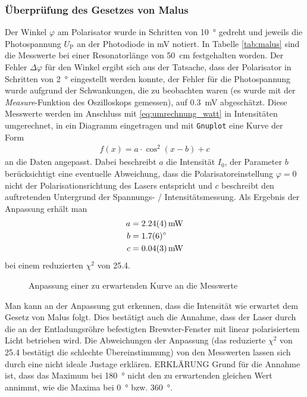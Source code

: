 \documentclass[11pt, a4paper]{article}
\numberwithin{equation}{section}
\begin{document}
\subsubsection{Überprüfung des Gesetzes von Malus}
Der Winkel $\varphi$ am Polarisator wurde in Schritten von \SI{10}{\degree} gedreht und jeweils die Photospannung $U_\text{P}$ an der Photodiode in \si{\milli\volt} notiert.
In Tabelle \ref{tab:malus} sind die Messwerte bei einer Resonatorlänge von \SI{50}{\centi\metre} festgehalten worden.
Der Fehler $\Delta\varphi$ für den Winkel ergibt sich aus der Tatsache, dass der Polarisator in Schritten von \SI{2}{\degree} eingestellt werden konnte, der Fehler für die Photospannung wurde aufgrund der Schwankungen, die zu beobachten waren (es wurde mit der \emph{Measure}-Funktion des Oszilloskops gemessen), auf \SI{0.3}{\milli\volt} abgeschätzt.
Diese Messwerte werden im Anschluss mit \eqref{eq:umrechnung_watt} in Intensitäten umgerechnet, in ein Diagramm eingetragen und mit \texttt{Gnuplot} eine Kurve der Form
\begin{align}
f(x) = a\cdot\cos^2(x-b) + c
\end{align}
an die Daten angepasst.
Dabei beschreibt $a$ die Intensität $I_0$, der Parameter $b$ berücksichtigt eine eventuelle Abweichung, dass die Polarisatoreinstellung $\varphi=0$ nicht der Polarisationsrichtung des Lasers entspricht und $c$ beschreibt den auftretenden Untergrund der Spannungs- / Intensitätsmessung.
Als Ergebnis der Anpassung erhält man
\begin{align}
a&=\SI{2.24+-0.04}{\milli\watt}\\
b&=\SI{1.7+-0.6}{\degree}\\
c&=\SI{0.04+-0.03}{\milli\watt}
\end{align}
bei einem reduzierten $\chi^2$ von \num{25.4}.
\begin{figure}
	\centering
	
	\caption{Anpassung einer zu erwartenden Kurve an die Messwerte}
	\label{fig:malus}
\end{figure}
Man kann an der Anpassung gut erkennen, dass die Intensität wie erwartet dem Gesetz von Malus folgt.
Dies bestätigt auch die Annahme, dass der Laser durch die an der Entladungsröhre befestigten Brewster-Fenster mit linear polarisiertem Licht betrieben wird.
Die Abweichungen der Anpassung (das reduzierte $\chi^2$ von \num{25.4} bestätigt die schlechte Übereinstimmung) von den Messwerten lassen sich durch eine nicht ideale Justage erklären.
ERKLÄRUNG
Grund für die Annahme ist, dass das Maximum bei \SI{180}{\degree} nicht den zu erwartenden gleichen Wert annimmt, wie die Maxima bei \SI{0}{\degree} bzw. \SI{360}{\degree}.
\end{document}

